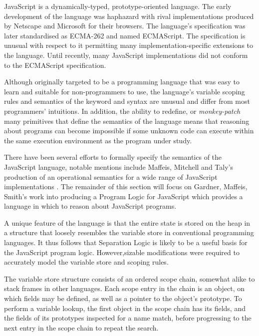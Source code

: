 \documentclass[a4paper]{report}
\begin{document}
  JavaScript is a dynamically-typed, prototype-oriented language. The
  early development of the language was haphazard with rival implementations
  produced by Netscape and Microsoft for their browsers. The language's
  specification was later standardised as ECMA-262 and named ECMAScript.
  The specification is unusual with respect to it permitting many
  implementation-specific extensions to the language. Until recently, many
  JavaScript implementations did not conform to the ECMAScript specification.

  Although originally targeted to be a programming language that was easy to
  learn and suitable for non-programmers to use, the language's variable scoping
  rules and semantics of the  keyword and  syntax are unusual
  and differ from most programmers' intuitions. In addition, the ability to
  redefine, or \emph{monkey-patch} many primitives that define the semantics of
  the language means that reasoning about programs can become impossible if
  some unknown code can execute within the same execution environment as the
  program under study.

  There have been several efforts to formally specify the semantics of the
  JavaScript language, notable mentions include Maffeis, Mitchell and Taly's
  production of an operational semantics for a wide range of JavaScript
  implementations \cite{maffeis-jsopsem}. The remainder of this section will
  focus on Gardner, Maffeis, Smith's work \cite{gms-popl} into producing a
  Program Logic for JavaScript which provides a language in which to reason
  about JavaScript programs.

  A unique feature of the
  language is that the entire state is stored on the heap in a structure that
  loosely resembles the variable store in conventional programming languages. It
  thus follows that Separation Logic is likely to be a useful basis for the
  JavaScript program logic. However,sizable modifications were required to
  accurately model the variable store and scoping rules.


  The variable store structure consists of an ordered scope chain,
  somewhat alike to
  stack frames in other languages. Each scope entry in the chain is an object,
  on which fields may be defined, as well as a pointer to the object's
  prototype. To perform a variable lookup, the first object in the scope chain has
  its fields, and the fields of its prototypes inspected for a name match, before
  progressing to the next entry in the scope chain to repeat the search.
\end{document}
